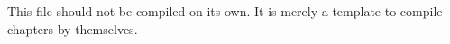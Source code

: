 \documentclass[openany]{memoir}
\begin{document}
This file should not be compiled on its own. It is merely a template to
compile chapters by themselves.
\end{document}
